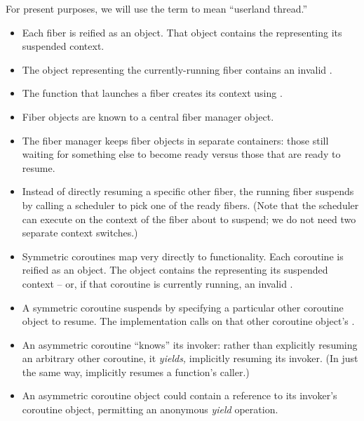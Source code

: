 \newpage
{}

For present purposes, we will use the term  to mean ``userland
thread.''

\begin{itemize}
\item Each fiber is reified as an object. That object contains the
   representing its suspended context.
\item The object representing the currently-running fiber contains
  an invalid .
\item The function that launches a fiber creates its context using
  .
\item Fiber objects are known to a central fiber manager object.
\item The fiber manager keeps fiber objects in separate containers: those
  still waiting for something else to become ready versus those that are ready
  to resume.
\item Instead of directly resuming a specific other fiber, the
  running fiber suspends by calling a scheduler to pick one of the ready
  fibers. (Note that the scheduler can execute on the context of the fiber
  about to suspend; we do not need two separate context switches.)
\end{itemize}


\begin{itemize}
\item Symmetric coroutines map very directly to  functionality.
  Each coroutine is reified as an object. The object contains the
   representing its suspended context -- or, if that
  coroutine is currently running, an invalid .
\item A symmetric coroutine suspends by specifying a particular other
  coroutine object to resume. The implementation calls \resume on that other
  coroutine object's .
\item An asymmetric coroutine ``knows'' its invoker: rather than explicitly
  resuming an arbitrary other coroutine, it \emph{yields,} implicitly resuming its
  invoker. (In just the same way,  implicitly resumes a function's
  caller.)
\item An asymmetric coroutine object could contain a reference to its
  invoker's coroutine object, permitting an anonymous \emph{yield} operation.
\end{itemize}

